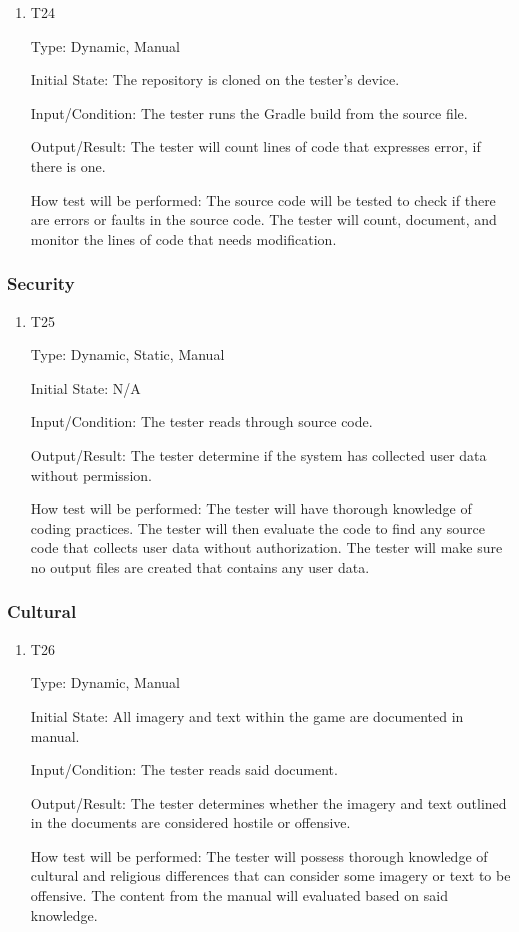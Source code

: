 \documentclass[12pt, titlepage]{article}
\begin{document}
\begin{enumerate}

\item{T24}

Type: Dynamic, Manual

Initial State: The repository is cloned on the tester's device.

Input/Condition: The tester runs the Gradle build from the source file.

Output/Result: The tester will count lines of code that expresses error, if there is one.

How test will be performed: The source code will be tested to check if there are errors or faults in the source code. The tester will count, document, and monitor the lines of code that needs modification.

\end{enumerate}

\subsubsection{Security}

\begin{enumerate}

\item{T25}

Type: Dynamic, Static, Manual

Initial State: N/A

Input/Condition: The tester reads through source code.

Output/Result: The tester determine if the system has collected user data without permission.

How test will be performed: The tester will have thorough knowledge of coding practices. The tester will then evaluate the code to find any source code that collects user data without authorization. The tester will make sure no output files are created that contains any user data.

\end{enumerate}

\subsubsection{Cultural}

\begin{enumerate}

\item{T26}

Type: Dynamic, Manual

Initial State: All imagery and text within the game are documented in manual.

Input/Condition: The tester reads said document.

Output/Result: The tester determines whether the imagery and text outlined in the documents are considered hostile or offensive.

How test will be performed: The tester will possess thorough knowledge of cultural and religious differences that can consider some imagery or text to be offensive. The content from the manual will evaluated based on said knowledge.

\end{enumerate}
\end{document}
